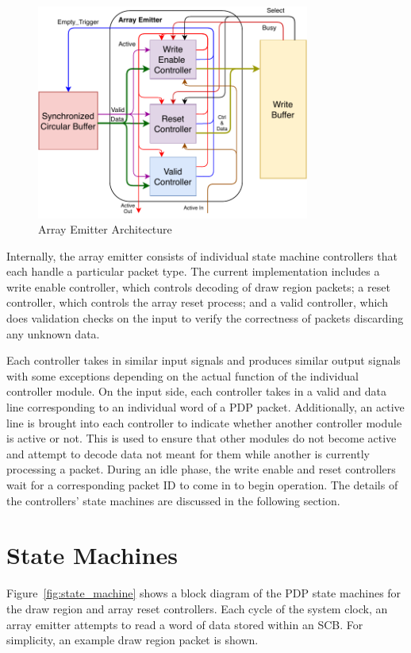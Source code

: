     \begin{figure}[t]
        \centering
        \includegraphics[width=0.80\textwidth]{fig/pdp_ae_arch.pdf}
        \caption{Array Emitter Architecture}
        \label{fig:ae_arch}
    \end{figure}

    Internally, the array emitter consists of individual state machine controllers that each handle a particular packet type. The current implementation includes a write enable controller, which controls decoding of draw region packets; a reset controller, which controls the array reset process; and a valid controller, which does validation checks on the input to verify the correctness of packets discarding any unknown data.

    Each controller takes in similar input signals and produces similar output signals with some exceptions depending on the actual function of the individual controller module. On the input side, each controller takes in a valid and data line corresponding to an individual word of a PDP packet. Additionally, an active line is brought into each controller to indicate whether another controller module is active or not. This is used to ensure that other modules do not become active and attempt to decode data not meant for them while another is currently processing a packet. During an idle phase, the write enable and reset controllers wait for a corresponding packet ID to come in to begin operation. The details of the controllers' state machines are discussed in the following section.

\section{State Machines}
    \label{sec:state_machines}
    Figure~\ref{fig:state_machine} shows a block diagram of the PDP state machines for the draw region and array reset controllers. Each cycle of the system clock, an array emitter attempts to read a word of data stored within an SCB. For simplicity, an example draw region packet is shown.

